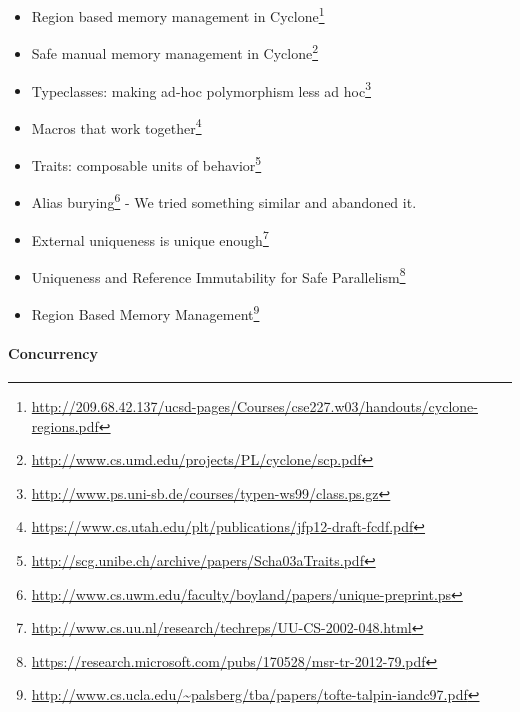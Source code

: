 \documentclass[a4paper,]{book}
\renewcommand{\href}[2]{#2\footnote{\url{#1}}}
\let\oldparagraph\paragraph
\renewcommand{\paragraph}[1]{\oldparagraph{#1}\mbox{}}
\begin{document}
\begin{itemize}
\itemsep1pt\parskip0pt
\item
  \href{http://209.68.42.137/ucsd-pages/Courses/cse227.w03/handouts/cyclone-regions.pdf}{Region
  based memory management in Cyclone}
\item
  \href{http://www.cs.umd.edu/projects/PL/cyclone/scp.pdf}{Safe manual
  memory management in Cyclone}
\item
  \href{http://www.ps.uni-sb.de/courses/typen-ws99/class.ps.gz}{Typeclasses:
  making ad-hoc polymorphism less ad hoc}
\item
  \href{https://www.cs.utah.edu/plt/publications/jfp12-draft-fcdf.pdf}{Macros
  that work together}
\item
  \href{http://scg.unibe.ch/archive/papers/Scha03aTraits.pdf}{Traits:
  composable units of behavior}
\item
  \href{http://www.cs.uwm.edu/faculty/boyland/papers/unique-preprint.ps}{Alias
  burying} - We tried something similar and abandoned it.
\item
  \href{http://www.cs.uu.nl/research/techreps/UU-CS-2002-048.html}{External
  uniqueness is unique enough}
\item
  \href{https://research.microsoft.com/pubs/170528/msr-tr-2012-79.pdf}{Uniqueness
  and Reference Immutability for Safe Parallelism}
\item
  \href{http://www.cs.ucla.edu/~palsberg/tba/papers/tofte-talpin-iandc97.pdf}{Region
  Based Memory Management}
\end{itemize}

\paragraph{Concurrency}\label{concurrency}
\end{document}
